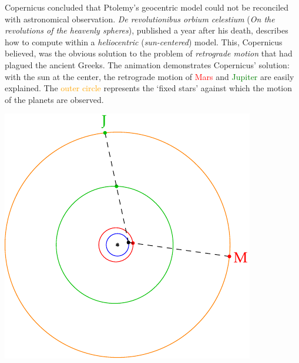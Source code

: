 \begin{minipage}[t]{0.69\linewidth}\vspace{-3pt}
	Copernicus concluded that Ptolemy's geocentric model could not be reconciled with astronomical observation. \emph{De revolutionibus orbium celestium} (\emph{On the revolutions of the heavenly spheres}), published a year after his death, describes how to compute within a \emph{heliocentric} (\emph{sun-centered}) model. This, Copernicus believed, was the obvious solution to the problem of \emph{retrograde motion} that had plagued the ancient Greeks.\footnotemark{}\smallbreak
	The animation demonstrates Copernicus' solution: with the sun at the center, the retrograde motion of \textcolor{red}{Mars} and \textcolor{Green}{Jupiter} are easily explained. The \textcolor{orange}{outer circle} represents the `fixed stars' against which the motion of the planets are observed.
\end{minipage}
\hfill
\begin{minipage}[t]{0.3\linewidth}\vspace{-8pt}
	\flushright\href{%
		http://math.uci.edu/~ndonalds/math184/retrograde.html%
	}{\includegraphics[scale=0.7]{retrograde-movie}}
\end{minipage}\medbreak


